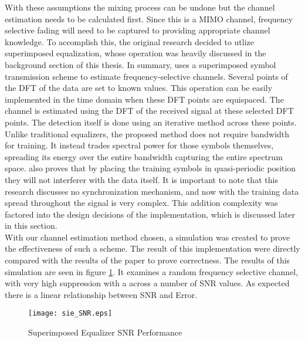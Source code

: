 With these assumptions the mixing process can be undone but the channel estimation needs to be calculated first.  Since this is a MIMO channel, frequency selective fading will need to be captured to providing appropriate channel knowledge.  To accomplish this, the original research decided to utlize superimposed equalization, whose operation was heavily discussed in the background section of this thesis.  In summary, \cite{Ghogho} uses a superimposed symbol transmission scheme to estimate frequency-selective channels. Several points of the DFT of the data are set to known values. This operation can be easily implemented in the time domain when these DFT points are equispaced. The channel is estimated using the DFT of the received signal at these selected DFT points. The detection itself is done using an iterative method across these points.  Unlike traditional equalizers, the proposed method does not require bandwidth for training.  It instead trades spectral power for those symbols themselves, spreading its energy over the entire bandwidth capturing the entire spectrum space.   \cite{Ghogho} also proves that by placing the training symbols in quasi-periodic position they will not interferer with the data itself.  It is important to note that this research discusses no synchronization mechanism, and now with the training data spread throughout the signal is very complex.  This addition complexity was factored into the design decisions of the implementation, which is discussed later in this section.\\

With our channel estimation method chosen, a simulation was created to prove the effectiveness of such a scheme.  The result of this implementation were directly compared with the results of the paper to prove correctness.%
The results of this simulation are seen in figure \ref{sie}.  It examines a random frequency selective channel, with very high suppression with a across a number of SNR values.  As expected there is a linear relationship between SNR and Error.\\  %

\begin{figure}[!ht]\label{sie}
\centering
\texttt{[image: sie\_SNR.eps]}
\caption{Superimposed Equalizer SNR Performance}
\end{figure}

